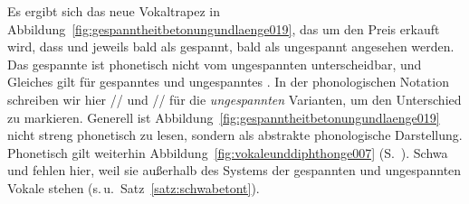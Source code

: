 Es ergibt sich das neue Vokaltrapez in Abbildung~\ref{fig:gespanntheitbetonungundlaenge019}, das um den Preis erkauft wird, dass \textipa{[E]} und \textipa{[a]} jeweils bald als gespannt, bald als ungespannt angesehen werden.
Das gespannte \textipa{[a]} ist phonetisch nicht vom ungespannten \textipa{[a]} unterscheidbar, und Gleiches gilt für gespanntes und ungespanntes \textipa{[E]}.
In der phonologischen Notation schreiben wir hier // und // für die \textit{ungespannten} Varianten, um den Unterschied zu markieren.
Generell ist Abbildung~\ref{fig:gespanntheitbetonungundlaenge019} nicht streng phonetisch zu lesen, sondern als abstrakte phonologische Darstellung.
Phonetisch gilt weiterhin Abbildung~\ref{fig:vokaleunddiphthonge007} (S.~\pageref{fig:vokaleunddiphthonge007}).
Schwa und \textipa{[5]} fehlen hier, weil sie außerhalb des Systems der gespannten und ungespannten Vokale stehen (s.\,u.\ Satz~\ref{satz:schwabetont}).

